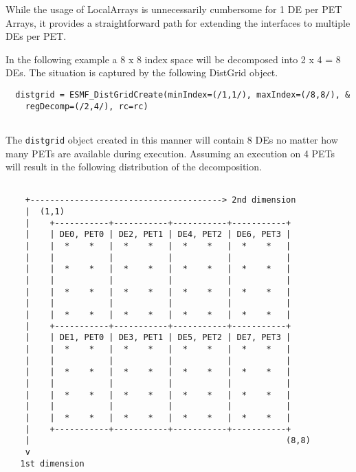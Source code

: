    While the usage of LocalArrays is unnecessarily cumbersome for 1 DE per PET
   Arrays, it provides a straightforward path for extending the interfaces
   to multiple DEs per PET. 
  
   In the following example a 8 x 8 index space will be decomposed into
   2 x 4 = 8 DEs. The situation is captured by the following DistGrid object. 

 \begin{verbatim}
  distgrid = ESMF_DistGridCreate(minIndex=(/1,1/), maxIndex=(/8,8/), &
    regDecomp=(/2,4/), rc=rc)
 
\end{verbatim}
 

  
   The {\tt distgrid} object created in this manner will contain 8 DEs no 
   matter how many PETs are available during execution. Assuming an execution
   on 4 PETs will result in the following distribution of the decomposition.
  
   \begin{verbatim}
   
    +---------------------------------------> 2nd dimension
    |  (1,1)
    |    +-----------+-----------+-----------+-----------+
    |    | DE0, PET0 | DE2, PET1 | DE4, PET2 | DE6, PET3 |
    |    |  *    *   |  *    *   |  *    *   |  *    *   |
    |    |           |           |           |           |
    |    |  *    *   |  *    *   |  *    *   |  *    *   |
    |    |           |           |           |           |
    |    |  *    *   |  *    *   |  *    *   |  *    *   |
    |    |           |           |           |           |
    |    |  *    *   |  *    *   |  *    *   |  *    *   |
    |    +-----------+-----------+-----------+-----------+
    |    | DE1, PET0 | DE3, PET1 | DE5, PET2 | DE7, PET3 |
    |    |  *    *   |  *    *   |  *    *   |  *    *   |
    |    |           |           |           |           |
    |    |  *    *   |  *    *   |  *    *   |  *    *   |
    |    |           |           |           |           |
    |    |  *    *   |  *    *   |  *    *   |  *    *   |
    |    |           |           |           |           |
    |    |  *    *   |  *    *   |  *    *   |  *    *   |
    |    +-----------+-----------+-----------+-----------+
    |                                                    (8,8)
    v 
   1st dimension
  
   \end{verbatim}
  

